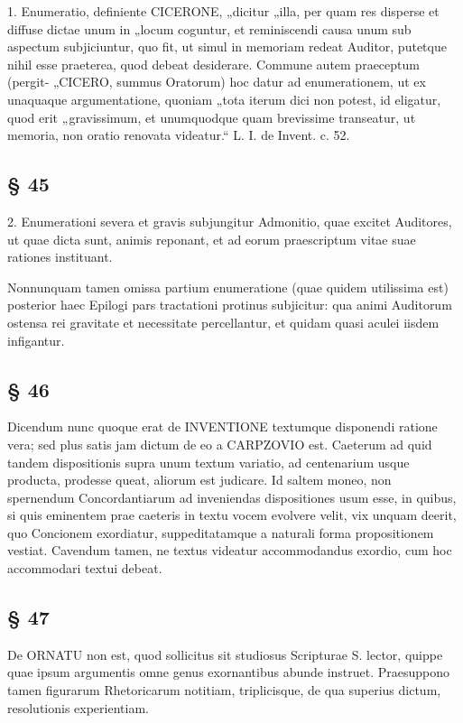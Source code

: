1. Enumeratio, definiente CICERONE, „dicitur „illa, per quam res disperse et diffuse dictae unum in „locum coguntur, et reminiscendi causa unum sub aspectum subjiciuntur, quo fit, ut simul in memoriam redeat Auditor, putetque nihil esse praeterea, quod debeat desiderare. Commune autem praeceptum (pergit- „CICERO, summus Oratorum) hoc datur ad enumerationem, ut ex unaquaque argumentatione, quoniam „tota iterum dici non potest, id eligatur, quod erit „gravissimum, et unumquodque quam brevissime transeatur, ut memoria, non oratio renovata videatur.“ L. I. de Invent. c. 52.

\subsection{§ 45}

2. Enumerationi severa et gravis subjungitur Admonitio, quae excitet Auditores, ut quae dicta sunt, animis reponant, et ad eorum praescriptum vitae suae rationes instituant.

Nonnunquam tamen omissa partium enumeratione (quae quidem utilissima est) posterior haec Epilogi pars tractationi protinus subjicitur: qua animi Auditorum ostensa rei gravitate et necessitate percellantur, et quidam quasi aculei iisdem infigantur.

\subsection{§ 46}

Dicendum nunc quoque erat de INVENTIONE textumque disponendi ratione vera; sed plus satis jam dictum de eo a CARPZOVIO est. Caeterum ad quid tandem dispositionis supra unum textum variatio, ad centenarium usque producta, prodesse queat, aliorum est judicare. Id saltem moneo, non spernendum Concordantiarum ad inveniendas dispositiones usum esse, in quibus, si quis eminentem prae caeteris in textu vocem evolvere velit, vix unquam deerit, quo Concionem exordiatur, suppeditatamque a naturali forma propositionem vestiat. Cavendum tamen, ne textus videatur accommodandus exordio, cum hoc accommodari textui debeat.

\subsection{§ 47}

De ORNATU non est, quod sollicitus sit studiosus Scripturae S. lector, quippe quae ipsum argumentis omne genus exornantibus abunde instruet. Praesuppono tamen figurarum Rhetoricarum notitiam, triplicisque, de qua superius dictum, resolutionis experientiam.


